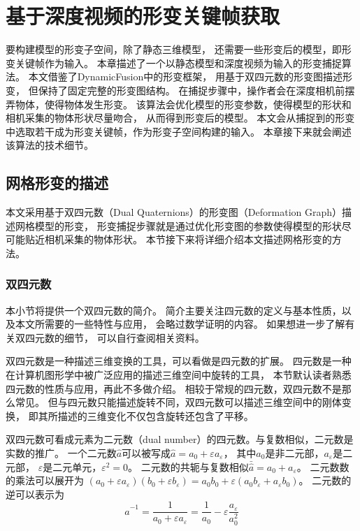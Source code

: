 \chapter{基于深度视频的形变关键帧获取}
要构建模型的形变子空间，除了静态三维模型，
还需要一些形变后的模型，即形变关键帧作为输入。
本章描述了一个以静态模型和深度视频为输入的形变捕捉算法。
本文借鉴了DynamicFusion\cite{newcombe2015dynamicfusion}中的形变框架，
用基于双四元数的形变图描述形变，
但保持了固定完整的形变图结构。
在捕捉步骤中，操作者会在深度相机前摆弄物体，使得物体发生形变。
该算法会优化模型的形变参数，使得模型的形状和相机采集的物体形状尽量吻合，
从而得到形变后的模型。
本文会从捕捉到的形变中选取若干成为形变关键帧，作为形变子空间构建的输入。
本章接下来就会阐述该算法的技术细节。
\section{网格形变的描述}
本文采用基于双四元数（Dual Quaternions）的形变图（Deformation Graph）描述网格模型的形变，
形变捕捉步骤就是通过优化形变图的参数使得模型的形状尽可能贴近相机采集的物体形状。
本节接下来将详细介绍本文描述网格形变的方法。
\subsection{双四元数}
本小节将提供一个双四元数的简介。
简介主要关注四元数的定义与基本性质，以及本文所需要的一些特性与应用，
会略过数学证明的内容。
如果想进一步了解有关双四元数的细节，
可以自行查阅相关资料\cite{mccarthy1990introduction}\cite{kavan2006dual}。

双四元数是一种描述三维变换的工具，可以看做是四元数的扩展。
四元数是一种在计算机图形学中被广泛应用的描述三维空间中旋转的工具，
本节默认读者熟悉四元数的性质与应用，再此不多做介绍。
相较于常规的四元数，双四元数不是那么常见。
但与四元数只能描述旋转不同，双四元数可以描述三维空间中的刚体变换，
即其所描述的三维变化不仅包含旋转还包含了平移。

双四元数可看成元素为二元数（dual number）的四元数。与复数相似，二元数是实数的推广。
一个二元数$\hat{a}$可以被写成$\hat{a} = a_0 + \varepsilon a_{\varepsilon}$，
其中$a_0$是非二元部，$a_{\varepsilon}$是二元部，
$\varepsilon$是二元单元，${\varepsilon}^2=0$。
二元数的共轭与复数相似$\bar{\hat{a}} = a_0 + a_{\varepsilon}$。
二元数数的乘法可以展开为
$(a_0+\varepsilon a_{\varepsilon})(b_0 + \varepsilon b_{\varepsilon})=
 a_0b_0 + \varepsilon (a_0b_{\varepsilon} + a_{\varepsilon}b_0)$。
二元数的逆可以表示为
\begin{equation}
    \hat{a}^{-1}=\frac{1}{a_0+\varepsilon a_{\varepsilon}}
    =\frac{1}{a_0}-\varepsilon \frac{a_{\varepsilon}}{a^2_0}
\end{equation}

